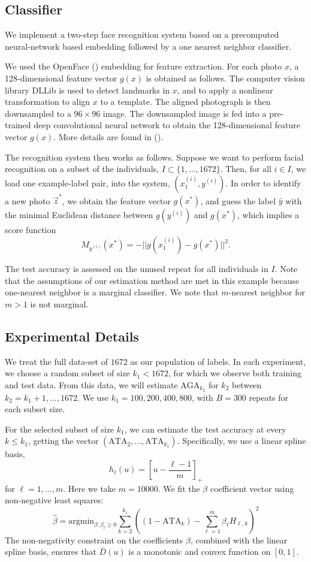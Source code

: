 \documentclass[twoside,11pt]{article}
\newcommand{\argmin}{\text{argmin}}
\begin{document}
\subsection{Classifier}
We implement a two-step face recognition system based on a precomputed neural-network based embedding followed by a one nearest neighbor classifier.

We used the OpenFace  (\cite{amos2016openface}) embedding for feature extraction.  For each photo $x$, a 128-dimensional feature vector $g(x)$ is
obtained as follows.
The computer vision library DLLib is used to detect landmarks in $x$, and to apply a nonlinear transformation to align
 $x$ to a template.
The aligned photograph is then downsampled to a $96 \times 96$ image. The downsampled image is fed into a pre-trained deep convolutional neural network to  obtain the 128-dimensional feature vector $g(x)$. More details are found in (\cite{amos2016openface}).

The recognition system then works as follows.  Suppose we want to
perform facial recognition on a subset of the individuals, $I \subset
\{1,\hdots, 1672\}$.  Then, for all $i \in I$, we load one example-label pair, into the system, $(x_1^{(i)}, y^{(i)})$.  In
order to identify a new photo $\vec{z}^*$, we obtain the feature
vector $g(x^*)$, and guess the label $\hat{y}$
with the minimal Euclidean distance between $g(y^{(i)})$ and $g(x^*)$,
which implies a score function
\[
M_{y^{(i)}}(x^*) = -||g(x_1^{(i)}) - g(x^*)||^2.
\]


The test accuracy is assessed on the unused repeat for all individuals
in $I$.  Note that the assumptions of our estimation method are met in
this example because one-nearest neighbor is a marginal classifier.
We note that $m$-nearest neighbor for $m > 1$ is not marginal.

\subsection{Experimental Details}
We treat the full data-set of $1672$ as our population of labels. In each experiment, we choose a random subset of size $k_1<1672$, for which we observe both training and test data. From this data, we will estimate $\text{AGA}_{k_2}$ for $k_2$ between $k_2 = k_1+1,...,1672$. We use $k_1 = 100,200,400,800$, with $B = 300$ repeats for each subset size.

For the selected subset of size $k_1$, we can estimate the test accuracy at every $k \leq k_1$, getting the vector $(\text{ATA}_2,...,\text{ATA}_{k_1})$.
Specifically, we use a linear
spline basis,
\[
h_\ell(u) = \left[u - \frac{\ell - 1}{m}\right]_+
\]
for $\ell = 1,\hdots, m$.  Here we take $m = 10000$. 
We fit the $\beta$ coefficient vector using non-negative least squares: 
\[
\hat{\beta} = \argmin_{\beta: \beta_\ell \geq 0} \sum_{k=2}^{k_1} \left( (1 - \text{ATA}_k) - \sum_{\ell=1}^m \beta_\ell H_{\ell, k}\right)^2
\]
The non-negativity constraint on the
coefficients $\beta$, combined with the linear spline basis, ensures
that $\bar{D}(u)$ is a monotonic and convex function on $[0,1]$. 
\end{document}
